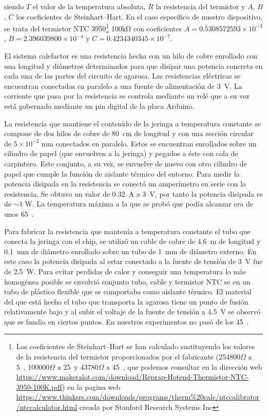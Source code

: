 siendo $T$ el valor de la temperatura absoluta, $R$ la resistencia del termistor y $A$, $B$, $C$ los coeficientes de Steinhart–Hart. En el caso específico de nuestro dispositivo, se trata del termistor NTC 3950\footnote{Los coeficientes de Steinhart–Hart se han calculado sustituyendo los valores de la resistencia del termistor proporcionados por el fabricante (254800$\Omega$ a 5~\celsius, 100000$\Omega$ a 25~\celsius y 43780$\Omega$ a 45~\celsius, que podemos consultar en la dirección web \url{https://www.makeralot.com/download/Reprap-Hotend-Thermistor-NTC-3950-100K.pdf}) en la pagina web \url{https://www.thinksrs.com/downloads/programs/therm\%20calc/ntccalibrator/ntccalculator.html} creada por Stanford Research Systems Inc} 100$\mathrm{k\Omega}$ con coeficientes $A = 0.5308572593\times{10}^{-3}$, $B = 2.396039800\times{10}^{-4}$ y $C = 0.4234340345\times{10}^{-7}$.

El sistema calefactor es una resistencia hecha con un hilo de cobre enrollado con una longitud y diámetros determinados para que disipar una potencia concreta en cada una de las partes del circuito de agarosa. Las resistencias eléctricas se encuentran conectadas en paralelo a una fuente de alimentación de 3~V. La corriente que pasa por la resistencia se controla mediante un relé que a su vez está gobernado mediante un pin digital de la placa Arduino.

La resistencia que mantiene el contenido de la jeringa a temperatura constante se compone de dos hilos de cobre de 80~cm de longitud y con una sección circular de $5\times10^{-2}\;\mathrm{mm}$ conectados en paralelo. Estos se encuentran enrollados sobre un cilindro de papel (que envuelven a la jeringa) y pegados a éste con cola de carpintero. Este conjunto, a su vez, se envuelve de nuevo con otro cilindro de papel que cumple la función de aislante térmico del entorno. Para medir la potencia disipada en la resistencia se conectó un amperímetro en serie con la resistencia. Se obtuvo un valor de 0.32~A a 3~V, por tanto la potencia disipada es de $\sim1\;\mathrm{W}$. La temperatura máxima a la que se probó que podía alcanzar era de unos 65~\celsius.

Para fabricar la resistencia que mantenía a temperatura constante el tubo que conecta la jeringa con el chip, se utilizó un cable de cobre de 4.6~m de longitud y 0.1~mm de diámetro enrollado sobre un tubo de 1~mm de diámetro externo. En este caso la potencia disipada al estar conectado a la fuente de tensión de 3~V fue de 2.5~W. Para evitar perdidas de calor y conseguir una temperatura lo más homogénea posible se envolvió conjunto tubo, cable y termistor NTC se en un tubo de plástico flexible que se comportaba como aislante térmico. El material del que está hecho el tubo que transporta la agarosa tiene un punto de fusión relativamente bajo y al subir el voltaje de la fuente de tensión a 4.5~V se observó que se fundía en ciertos puntos. En nuestros experimentos no pasó de los 45~\celsius.

